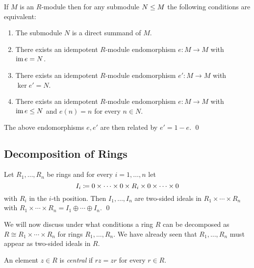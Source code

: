 \begin{corollary}
  If $M$ is an $R$-module then for any submodule $N \leq M$ the following conditions are equivalent:
  \begin{enumerate}
    \item
      The submodule $N$ is a direct summand of $M$.
    \item
      There exists an idempotent $R$-module endomorphism $e \colon M \to M$ with $\operatorname{im} e = N$.
    \item
      There exists an idempotent $R$-module endomorphism $e' \colon M \to M$ with $\ker e' = N$.
    \item
      There exists an idempotent $R$-module endomorphism $e \colon M \to M$ with $\operatorname{im} e \leq N$ and $e(n) = n$ for every $n \in N$.
  \end{enumerate}
  The above endomorphisms $e, e'$ are then related by $e' = 1 - e$.
  \qed
\end{corollary}





\subsection{Decomposition of Rings}


\begin{lemma}
  Let $R_1, \dotsc, R_n$ be rings and for every $i = 1, \dotsc, n$ let
  \[
              I_i
    \coloneqq  0 \times \dotsb \times 0 \times R_i \times 0 \times \dotsb \times 0
  \]
  with $R_i$ in the $i$-th position.
  Then $I_1, \dotsc, I_n$ are two-sided ideals in $R_1 \times \dotsb \times R_n$ with $R_1 \times \dotsb \times R_n = I_1 \oplus \dotsb \oplus I_n$.
  \qed
\end{lemma}


\begin{fluff}
  We will now discuss under what conditions a ring $R$ can be decomposed as $R \cong R_1 \times \dotsb \times R_n$ for rings $R_1, \dotsc, R_n$.
  We have already seen that $R_1, \dotsc, R_n$ must appear as two-sided ideals in $R$.
\end{fluff}


\begin{definition}
  An element $z \in R$ is \emph{central} if $rz = zr$ for every $r \in R$.
\end{definition}


